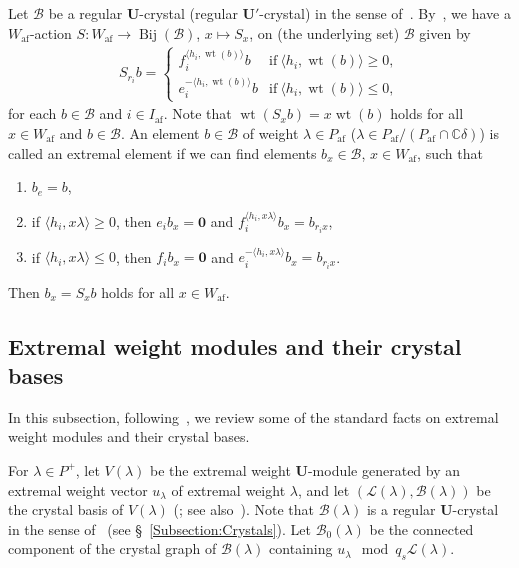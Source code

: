 \documentclass[10pt]{amsart}
\theoremstyle{definition}\newtheorem{defi}[theo]{Definition}
\theoremstyle{remark}\newtheorem{rema}[theo]{Remark}
\newcommand{\BC}{\mathbb{C}}
\newcommand\bm[1]{\boldsymbol{#1}}
\newcommand{\U}{\mathbf{U}}
\DeclareMathOperator{\af}{af}
\DeclareMathOperator{\wt}{wt}
\DeclareMathOperator{\Bij}{Bij}
\begin{document}
Let 
$\mathcal{B}$ 
be a regular $\U$-crystal (\resp regular $\U'$-crystal) in the sense of~\cite[\S~2.2]{K02}. 
By~\cite[\S~7]{K94}, 
we have a $W_{\af}$-action 
$S : W_{\af} \rightarrow \Bij(\mathcal{B})$, $x \mapsto S_x$, 
on (the underlying set) 
$\mathcal{B}$
given by
\begin{align} \label{eq:W-action}
S_{r_i} b
=
\begin{cases}
f_i^{\langle h_i , \wt (b) \rangle} b & \text{if}\ \langle h_i , \wt (b) \rangle \geq 0, \\%
e_i^{-\langle h_i , \wt (b) \rangle} b & \text{if}\ \langle h_i , \wt (b) \rangle \leq 0, 
\end{cases}
\end{align}
for each 
$b \in \mathcal{B}$ 
and 
$i \in I_{\af}$. 
Note that 
$\wt (S_x b) = x \wt (b)$ 
holds for all
$x \in W_{\af}$ and $b \in \mathcal{B}$. 
An element 
$b \in \mathcal{B}$ 
of weight 
$\lambda \in P_{\af}$
(\resp $\lambda \in P_{\af} / (P_{\af} \cap \BC \delta)$)
is called an extremal element if we can find elements
$b_x \in \mathcal{B}$, $x \in W_{\af}$, 
such that 
\begin{enumerate}[label=(E\arabic*)]
\item
$b_e = b$, 
\item
if 
$\langle h_i , x\lambda \rangle \geq 0$, 
then
$e_i b_x = \bm{0}$
and 
$f_i^{\langle h_i , x\lambda \rangle} b_x = b_{r_i x}$, 
\item
if 
$\langle h_i , x\lambda \rangle \leq 0$, 
then
$f_i b_x = \bm{0}$
and 
$e_i^{-\langle h_i , x\lambda \rangle} b_x = b_{r_i x}$. 
\end{enumerate}
Then 
$b_x = S_x b$
holds for all 
$x \in W_{\af}$.

\subsection{Extremal weight modules and their crystal bases} \label{Subsection:extremal}

In this subsection, 
following~\cite{BN04,K94,K02}, 
we review some of the standard facts on 
extremal weight modules and their crystal bases.

For 
$\lambda \in P^+$, 
let 
$V(\lambda)$ 
be the extremal weight $\U$-module generated by an extremal weight vector 
$u_{\lambda}$ 
of extremal weight 
$\lambda$, 
and let 
$(\mathcal{L}(\lambda) , \mathcal{B}(\lambda))$ 
be the crystal basis of 
$V(\lambda)$
(\cite[Proposition~8.2.2]{K94}; see also~\cite[\S~3.2]{K02}). 
Note that 
$\mathcal{B}(\lambda)$ 
is a regular $\U$-crystal in the sense of~\cite[\S~2.2]{K02} (see \S~\ref{Subsection:Crystals}). 
Let 
$\mathcal{B}_0(\lambda)$ 
be the connected component of the crystal graph of 
$\mathcal{B}(\lambda)$
containing 
$u_{\lambda} \mod q_s \mathcal{L}(\lambda)$.
\end{document}
